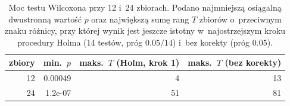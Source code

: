 \begin{table}[!htbp]
\centering\small
\caption{Moc testu Wilcoxona przy 12 i~24 zbiorach. Podano najmniejszą osiągalną dwustronną wartość $p$ oraz największą sumę rang $T$ zbiorów o~przeciwnym znaku różnicy, przy której wynik jest jeszcze istotny w~najostrzejszym kroku procedury Holma (14 testów, próg $0.05/14$) i~bez korekty (próg $0.05$).}
\label{tab:moc}
\begin{tabular}{rrrr}
\toprule
\textbf{zbiory} & \textbf{min.\ $p$} & \textbf{maks.\ $T$ (Holm, krok 1)} & \textbf{maks.\ $T$ (bez korekty)} \\
\midrule
12 & 0.00049 & 4 & 13 \\
24 & 1.2e-07 & 51 & 81 \\
\bottomrule
\end{tabular}
\end{table}
